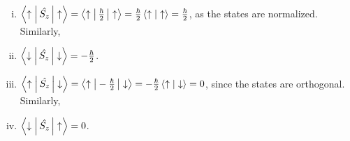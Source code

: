 \documentclass[12pt]{article}
\begin{document}
\begin{enumerate}[1.]
\begin{enumerate}[(a)]
                     \begin{enumerate}[i.]
                            \item $\left \langle \uparrow \vphantom{\hat{S_z}} \right | \hat{S_z} \left | \vphantom{\hat{S_z}} \uparrow  \right \rangle = 
                            \left \langle \uparrow \vphantom{\frac{\hbar}{2}} \right | \frac{\hbar}{2} \left | \vphantom{\frac{\hbar}{2}} \uparrow  \right \rangle =
                            \frac{\hbar}{2}\left \langle \uparrow \vphantom{1} \right | \left. \uparrow \right \rangle = \frac{\hbar}{2} $, as the states are normalized. Similarly,
                            \item $\left \langle \downarrow \vphantom{\hat{S_z}} \right | \hat{S_z} \left | \vphantom{\hat{S_z}} \downarrow  \right \rangle = -\frac{\hbar}{2}$.
                            \item $\left \langle \uparrow \vphantom{\hat{S_z}} \right | \hat{S_z} \left | \vphantom{\hat{S_z}} \downarrow  \right \rangle = \left \langle \uparrow \vphantom{\frac{\hbar}{2}} \right | -\frac{\hbar}{2} \left | \vphantom{\frac{\hbar}{2}} \downarrow  \right \rangle = -\frac{\hbar}{2}\left \langle \uparrow \vphantom{1} \right | \left. \downarrow \right \rangle = 0$, since the states are orthogonal. Similarly,
                            \item $\left \langle \downarrow \vphantom{\hat{S_z}} \right | \hat{S_z} \left | \vphantom{\hat{S_z}} \uparrow  \right \rangle = 0$.


\end{enumerate}
\end{enumerate}
\end{enumerate}
\end{document}
